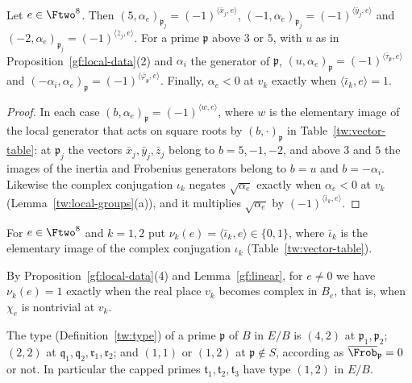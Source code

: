 \begin{lemma}\label{gf:linear}
Let $e\in\Ftwo^8$. Then
$(5,\alpha_e)_{\mathfrak p_j}=(-1)^{\langle\bar x_j,e\rangle}$,
$(-1,\alpha_e)_{\mathfrak p_j}=(-1)^{\langle\bar y_j,e\rangle}$ and
$(-2,\alpha_e)_{\mathfrak p_j}=(-1)^{\langle\bar z_j,e\rangle}$. For a prime
$\mathfrak p$ above $3$ or $5$, with $u$ as in
Proposition~\ref{gf:local-data}(2) and $\alpha_i$ the generator of
$\mathfrak p$,
$(u,\alpha_e)_{\mathfrak p}=(-1)^{\langle\bar\tau_{\mathfrak p},e\rangle}$ and
$(-\alpha_i,\alpha_e)_{\mathfrak p}=(-1)^{\langle\bar\varphi_{\mathfrak p},e\rangle}$.
Finally, $\alpha_e<0$ at $v_k$ exactly when $\langle\bar\iota_k,e\rangle=1$.
\end{lemma}

\begin{proof}
In each case $(b,\alpha_e)_{\mathfrak p}=(-1)^{\langle w,e\rangle}$, where $w$
is the elementary image of the local generator that acts on square roots by
$(b,\cdot)_{\mathfrak p}$ in Table~\ref{tw:vector-table}: at $\mathfrak p_j$
the vectors $\bar x_j,\bar y_j,\bar z_j$ belong to $b=5,-1,-2$, and above
$3$ and $5$ the images of the inertia and Frobenius generators belong to
$b=u$ and $b=-\alpha_i$. Likewise the complex conjugation $\iota_k$ negates
$\sqrt{\alpha_e}$ exactly when $\alpha_e<0$ at $v_k$
(Lemma~\ref{tw:local-groups}(a)), and it multiplies $\sqrt{\alpha_e}$ by
$(-1)^{\langle\bar\iota_k,e\rangle}$.
\end{proof}

\begin{definition}\label{gf:archimedean}
For $e\in\Ftwo^8$ and $k=1,2$ put
$\nu_k(e)=\langle\bar\iota_k,e\rangle\in\{0,1\}$, where $\bar\iota_k$ is the
elementary image of the complex conjugation $\iota_k$
(Table~\ref{tw:vector-table}).
\end{definition}

By Proposition~\ref{gf:local-data}(4) and Lemma~\ref{gf:linear}, for $e\ne0$
we have $\nu_k(e)=1$ exactly when the real place $v_k$ becomes complex in
$B_e$, that is, when $\chi_e$ is nontrivial at $v_k$.

\begin{corollary}\label{gf:types}
The type (Definition~\ref{tw:type}) of a prime $\mathfrak p$ of $B$ in
$E/B$ is $(4,2)$ at $\mathfrak p_1,\mathfrak p_2$; $(2,2)$ at
$\mathfrak q_1,\mathfrak q_2,\mathfrak r_1,\mathfrak r_2$; and $(1,1)$ or
$(1,2)$ at $\mathfrak p\notin S$, according as $\overline{\Frob}_{\mathfrak p}=0$
or not.
In particular the capped primes $\mathfrak t_1,\mathfrak t_2,\mathfrak t_3$
have type $(1,2)$ in $E/B$.
\end{corollary}

